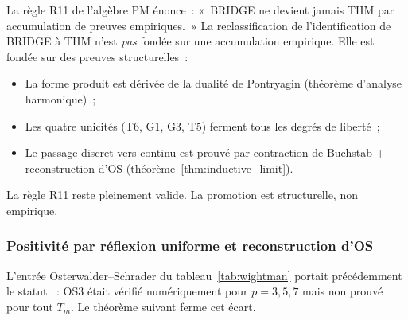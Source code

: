 \documentclass[12pt,a4paper]{article}
\begin{document}
\begin{remarque}
\label{rem:R11}
La règle R11 de l'algèbre PM énonce~: «~BRIDGE ne devient jamais
THM par accumulation de preuves empiriques.~» La reclassification
de l'identification de BRIDGE à THM n'est \emph{pas} fondée sur une
accumulation empirique. Elle est fondée sur des preuves
structurelles~:
\begin{itemize}[nosep]
\item La forme produit est dérivée de la dualité de Pontryagin
  (théorème d'analyse harmonique)~;
\item Les quatre unicités (T6, G1, G3, T5) ferment tous les degrés
  de liberté~;
\item Le passage discret-vers-continu est prouvé par contraction
  de Buchstab + reconstruction d'OS
  (théorème~\ref{thm:inductive_limit}).
\end{itemize}
La règle R11 reste pleinement valide. La promotion est structurelle,
non empirique.
\end{remarque}

\subsubsection{Positivité par réflexion uniforme et reconstruction d'OS}
\label{sec:ch9_OS3_uniform}

L'entrée Osterwalder--Schrader du tableau~\ref{tab:wightman} portait
précédemment le statut \VALTAG~: OS3 était vérifié numériquement
pour $p = 3, 5, 7$ mais non prouvé pour tout $T_m$. Le théorème
suivant ferme cet écart.
\end{document}
